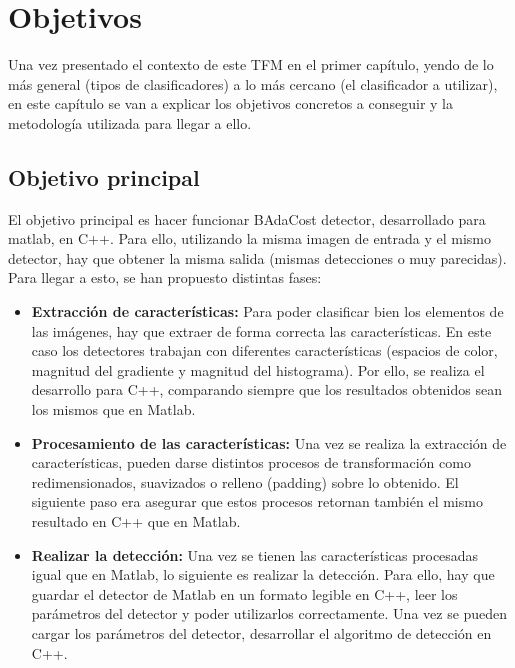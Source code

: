 \chapter{Objetivos}\label{cap.Objetivos}
Una vez presentado el contexto de este TFM en el primer capítulo, yendo de lo más general (tipos de clasificadores) a lo más cercano (el clasificador a utilizar), en este capítulo se van a explicar los objetivos concretos a conseguir y la metodología utilizada para llegar a ello.

\section{Objetivo principal}
El objetivo principal es hacer funcionar BAdaCost detector, desarrollado para matlab, en C++. Para ello, utilizando la misma imagen de entrada y el mismo detector, hay que obtener la misma salida (mismas detecciones o muy parecidas). Para llegar a esto, se han propuesto distintas fases:

\begin{itemize}
\item \textbf{Extracción de características: } Para poder clasificar bien los elementos de las imágenes, hay que extraer de forma correcta las características. En este caso los detectores trabajan con diferentes características (espacios de color, magnitud del gradiente y magnitud del histograma). Por ello, se realiza el desarrollo para C++, comparando siempre que los resultados obtenidos sean los mismos que en Matlab.

\item \textbf{Procesamiento de las características: } Una vez se realiza la extracción de características, pueden darse distintos procesos de transformación como redimensionados, suavizados o relleno (padding) sobre lo obtenido. El siguiente paso era asegurar que estos procesos retornan también el mismo resultado en C++ que en Matlab.

\item \textbf{Realizar la detección: } Una vez se tienen las características procesadas igual que en Matlab, lo siguiente es realizar la detección. Para ello, hay que guardar el detector de Matlab en un formato legible en C++, leer los parámetros del detector y poder utilizarlos correctamente. Una vez se pueden cargar los parámetros del detector, desarrollar el algoritmo de detección en C++.
\end{itemize}


